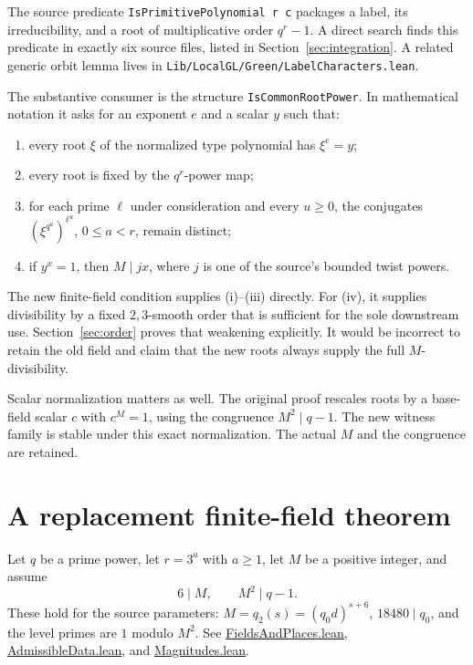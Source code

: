 \documentclass[11pt,a4paper]{article}
\theoremstyle{definition}
\theoremstyle{remark}
\newcommand{\code}[1]{{\small\nolinkurl{#1}}}
\newcommand{\src}[2]{\href{https://github.com/VladimirReshetnikov/ProveIt/blob/89d12dd40424f1217fd818d84877b3da52396a3b/Analysis/GeneralizedRiemannHypothesis/Lean/grh/src/#1.lean}{#2}}
\begin{document}
The source predicate \code{IsPrimitivePolynomial r c} packages a label, its
irreducibility, and a root of multiplicative order \(q^r-1\). A direct search finds
this predicate in exactly six source files, listed in
Section~\ref{sec:integration}. A related generic orbit lemma lives in
\code{Lib/LocalGL/Green/LabelCharacters.lean}.

The substantive consumer is the structure \code{IsCommonRootPower}. In mathematical
notation it asks for an exponent \(e\) and a scalar \(y\) such that:

\begin{enumerate}[label=(\roman*)]
\item every root \(\xi\) of the normalized type polynomial has \(\xi^e=y\);
\item every root is fixed by the \(q^r\)-power map;
\item for each prime \(\ell\) under consideration and every \(u\ge0\), the
conjugates \((\xi^{q^a})^{\ell^u}\), \(0\le a<r\), remain distinct;
\item if \(y^x=1\), then \(M\mid jx\), where \(j\) is one of the source's
bounded twist powers.
\end{enumerate}

The new finite-field condition supplies (i)--(iii) directly. For (iv), it supplies
divisibility by a fixed \(2,3\)-smooth order that is sufficient for the sole
downstream use. Section~\ref{sec:order} proves that weakening explicitly.
It would be incorrect to retain the old field and claim that the new roots
always supply the full \(M\)-divisibility.

Scalar normalization matters as well. The original proof rescales roots by a
base-field scalar \(c\) with \(c^M=1\), using the congruence \(M^2\mid q-1\).
The new witness family is stable under this exact normalization. The actual \(M\)
and the congruence are retained.

\section{A replacement finite-field theorem}
\label{sec:theorem}

Let \(q\) be a prime power, let \(r=3^a\) with \(a\ge1\), let \(M\) be a
positive integer, and assume
\begin{equation}
       6\mid M,\qquad M^2\mid q-1 .
       \label{eq:hyp}
\end{equation}
These hold for the source parameters: \(M=q_2(s)=(q_0d)^{s+6}\),
\(18480\mid q_0\), and the level primes are \(1\) modulo \(M^2\).
See \src{New/Reduction/Data/FieldsAndPlaces}{FieldsAndPlaces.lean},
\src{New/Reduction/Data/AdmissibleData}{AdmissibleData.lean}, and
\src{New/Reduction/Data/Magnitudes}{Magnitudes.lean}.
\end{document}
